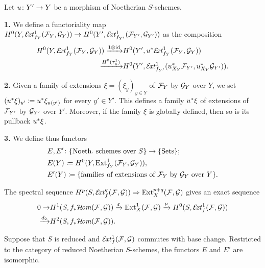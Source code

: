 \begin{definition} 
	Let $u\colon Y'\to Y$ be a morphism of Noetherian $S$-schemes.

	\textbf{1.} We define a functoriality map
	$H^0(Y,\mathcal{E}\!\mathit{xt}^1_{f_Y}(\mathcal{F}_Y,\mathcal{G}_Y))
	\to
	H^0(Y',\mathcal{E}\!\mathit{xt}^1_{f_{Y'}}(\mathcal{F}_{Y'},\mathcal{G}_{Y'}))
	$
	as the composition
	\begin{align*}
		H^0(Y,\mathcal{E}\!\mathit{xt}^1_{f_Y}(\mathcal{F}_Y,\mathcal{G}_Y))
		\xrightarrow{1\otimes \operatorname{id}} & 
		H^0(Y',u^{*}\mathcal{E}\!\mathit{xt}^1_{f_Y}(\mathcal{F}_Y,\mathcal{G}_Y)) \\
		\xrightarrow{H^0(\tau^1_u)} &
		H^0(Y',\mathcal{E}\!\mathit{xt}^1_{f_{Y'}}(u_{X_Y}^{*}\mathcal{F}_{Y'},u_{X_Y}^{*}\mathcal{G}_{Y'})).
	\end{align*}

	\textbf{2.} Given a family of extensions $\xi = (\xi_y)_{y\in Y}$ of $\mathcal{F}_Y$ by $\mathcal{G}_Y$ over $Y$, we set $(u^{*}\xi)_{y'} \coloneqq u^{*}\xi_{u(y')}$ for every $y' \in Y'$. This defines a family $u^{*}\xi$ of extensions of $\mathcal{F}_{Y'}$ by $\mathcal{G}_{Y'}$ over $Y'$. Moreover, if the family $\xi$ is globally defined, then so is its pullback $u^{*}\xi$.

	\textbf{3.} We define thus functors
	\begin{align*}
		& E,E' \colon \{\text{Noeth.\ schemes over } S\} \to \{\text{Sets}\}; \\
		& E(Y) \coloneqq H^0(Y,\operatorname{Ext}^1_{f_Y}(\mathcal{F}_Y,\mathcal{G}_Y)), \\
		& E'(Y) \coloneqq \{\text{families of extensions of $\mathcal{F}_Y$ by $\mathcal{G}_Y$ over } Y\}. \\
	\end{align*}

\end{definition}

\begin{remark}
	The spectral sequence $H^p(S,\mathcal{E}\!\mathit{xt}^q_f(\mathcal{F},\mathcal{G})) \Rightarrow \operatorname{Ext}^{p+q}_X(\mathcal{F},\mathcal{G})$ gives an exact sequence
	\begin{align*}
		0
		 \to & H^1(S,f_{*}\mathcal{H}\!\mathit{om}(\mathcal{F},\mathcal{G}))
		 \xrightarrow{\varepsilon} \operatorname{Ext}^1_X(\mathcal{F},\mathcal{G})
		 \xrightarrow{\mu} H^0(S,\mathcal{E}\!\mathit{xt}^1_f(\mathcal{F},\mathcal{G})) \\
		 \xrightarrow{d_2} & H^2(S,f_{*}\mathcal{H}\!\mathit{om}(\mathcal{F},\mathcal{G})).
	\end{align*}
\end{remark}

\begin{proposition}
	Suppose that $S$ is reduced and $\mathcal{E}\!\mathit{xt}^1_f(\mathcal{F},\mathcal{G})$ commutes with base change. Restricted to the category of reduced Noetherian $S$-schemes, the functors $E$ and $E'$ are isomorphic.
\end{proposition}

